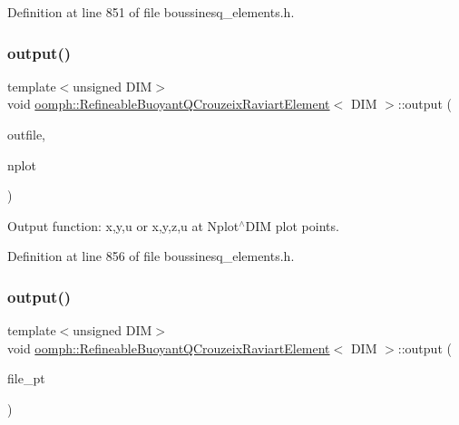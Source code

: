 Definition at line 851 of file boussinesq\+\_\+elements.\+h.

\mbox{\label{classoomph_1_1RefineableBuoyantQCrouzeixRaviartElement_a36bc6dc9052947f0932a605dd4d0e8f0}} 
\subsubsection{\texorpdfstring{output()}{output()}\hspace{0.1cm}{\footnotesize\ttfamily [2/4]}}
{\footnotesize\ttfamily template$<$unsigned D\+IM$>$ \\
void \hyperlink{classoomph_1_1RefineableBuoyantQCrouzeixRaviartElement}{oomph\+::\+Refineable\+Buoyant\+Q\+Crouzeix\+Raviart\+Element}$<$ D\+IM $>$\+::output (\begin{DoxyParamCaption}\item[{std\+::ostream \&}]{outfile,  }\item[{const unsigned \&}]{nplot }\end{DoxyParamCaption})\hspace{0.3cm}{\ttfamily [inline]}}



Output function\+: x,y,u or x,y,z,u at Nplot$^\wedge$\+D\+IM plot points. 



Definition at line 856 of file boussinesq\+\_\+elements.\+h.

\mbox{\label{classoomph_1_1RefineableBuoyantQCrouzeixRaviartElement_a90579086f991da7fbaf7d92b29abf994}} 
\subsubsection{\texorpdfstring{output()}{output()}\hspace{0.1cm}{\footnotesize\ttfamily [3/4]}}
{\footnotesize\ttfamily template$<$unsigned D\+IM$>$ \\
void \hyperlink{classoomph_1_1RefineableBuoyantQCrouzeixRaviartElement}{oomph\+::\+Refineable\+Buoyant\+Q\+Crouzeix\+Raviart\+Element}$<$ D\+IM $>$\+::output (\begin{DoxyParamCaption}\item[{F\+I\+LE $\ast$}]{file\+\_\+pt }\end{DoxyParamCaption})\hspace{0.3cm}{\ttfamily [inline]}}



